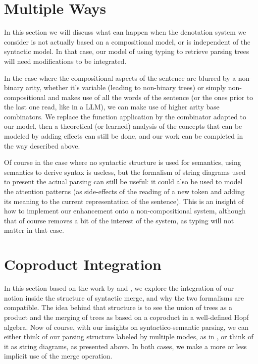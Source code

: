 \section{Multiple Ways}
\label{app:arities-and-denots}
In this section we will discuss what can happen when the denotation system
we consider is not actually based on a compositional model, or is independent
of the syntactic model.
In that case, our model of using typing to retrieve parsing trees will need
modifications to be integrated.

In the case where the compositional aspects of the sentence are blurred by a
non-binary arity, whether it's variable (leading to non-binary trees) or simply
non-compositional and makes use of all the words of the sentence (or the ones
prior to the last one read, like in a LLM), we can make use of higher arity
base combinators.
We replace the function application by the combinator adapted to our model,
then a theoretical (or learned) analysis of the concepts that can be modeled
by adding effects can still be done, and our work can be completed in the way
described above.

Of course in the case where no syntactic structure is used for semantics,
using semantics to derive syntax is useless, but the formalism of string
diagrams used to present the actual parsing can still be useful:
it could also be used to model the attention patterns (as side-effects of the
reading of a new token and adding its meaning to the current representation
of the sentence).
This is an insight of how to implement our enhancement onto a non-compositional
system, although that of course removes a bit of the interest of the system, as
typing will not matter in that case.

\section{Coproduct Integration}
In this section based on the work by
\cite{marcollimatildeetchomskynoametberwickrobertc.MathematicalStructureSyntactic}
and \cite{senturiaAlgebraicStructureMorphosyntax2025},
we explore the integration of our notion inside the structure of syntactic
merge, and why the two formalisms are compatible.
The idea behind that structure is to see the union of trees as a product and
the merging of trees as based on a coproduct in a well-defined Hopf algebra.
Now of course, with our insights on syntactico-semantic parsing, we can either
think of our parsing structure labeled by multiple modes, as in
\cite{bumfordEffectdrivenInterpretationFunctors2025}, or think of it as string
diagrams, as presented above.
In both cases, we make a more or less implicit use of the merge operation.

